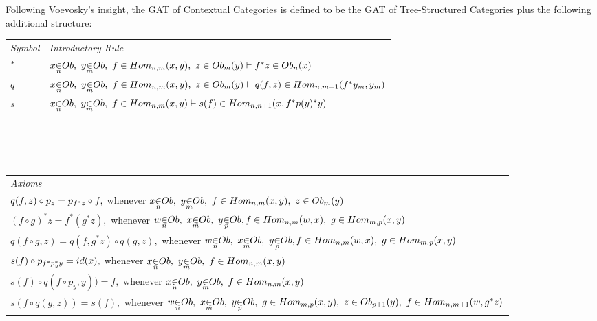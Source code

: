 \documentclass[10pt,a4paper]{scrartcl}
\begin{document}
\noindent Following Voevosky's insight, the GAT of Contextual Categories is defined to be the GAT of Tree-Structured Categories plus
the following additional structure: \\
\vspace{0.1cm} 
\begin{tabular}{>{\itshape}l l}
Symbol & \itshape{Introductory Rule} \\[0.1cm]
$^* $&$ \ofObi{x}{n} ,\  \ofObi{y}{m} ,\  \ofHomij{f}{n}{m}{x}{y} ,\  \ofT{z}{\Obi{m}(y)}
\tstyle \ofT {f \sub z}{\Obi{n}(x) } $\\[0.25cm]
$ q  $&$ \ofObi{x}{n} ,\  \ofObi{y}{m} ,\  \ofHomij{f}{n}{m}{x}{y} ,\  \ofT{z}{\Obi{m}(y)}
\tstyle
                     \ofT{q(f,z)}{  \Homij{n}{m+1}(f\sub y_m  , y_m ) }$  \\ [0.25cm]
$ s  $ & $ \ofObi{x}{n} ,\  \ofObi{y}{m} ,\  \ofHomij{f}{n}{m}{x}{y} \tstyle
                 \ofT{s(f)} {\Homij{n}{n+1}(x,f \sub p (y)  \sub y)} $ \\ [0.25cm]


\end{tabular} \\
\vspace{.1cm}  \\
\vspace{.03cm} \\
\begin{tabular}{l}
\itshape{Axioms} \\
$q(f,z) \circ p_z =p_{f^* z} \circ f,$ 
          whenever $\ofObi{x}{n} ,\  \ofObi{y}{m} ,\  \ofHomij{f}{n}{m}{x}{y} ,\  \ofT{z}{\Obi{m}(y)} $\\  [0.25cm]
					

$(f \circ g)^*z =  f^* (g ^* z), $
          whenever  $ \ofObi{w}{n} ,\ \ofObi{x}{m} ,\ \ofObi{y}{p}, 
					\ofHomij{f}{n}{m}{w}{x} ,\  \ofHomij{g}{m}{p}{x}{y}    $ \\[0.25cm]

$q(f \circ g,z) = q(f,g^*z) \circ q(g,z), $
				   whenever  $ \ofObi{w}{n} ,\ \ofObi{x}{m} ,\ \ofObi{y}{p}, 
					\ofHomij{f}{n}{m}{w}{x} ,\  \ofHomij{g}{m}{p}{x}{y}    $ \\[0.25cm]
					
$s(f) \circ p_{f ^* p_y ^* y} = id(x),$ 
          whenever $\ofObi{x}{n} ,\  \ofObi{y}{m} ,\  \ofHomij{f}{n}{m}{x}{y} $ \\ [0.25cm]
				
$s(f) \circ q( f \circ p_y    ,y))=f, $	
          whenever	$ \ofObi{x}{n} ,\  \ofObi{y}{m} ,\  \ofHomij{f}{n}{m}{x}{y} $ \\ [0.25cm]		
					
$s(f \circ q(g,z))=s(f),$ 
          whenever $\ofObi{w}{n} ,\  \ofObi{x}{m}  ,\   \ofObi{y}{p} ,\    \ofHomij{g}{m}{p}{x}{y} ,\ \ofT{z}{\Obi{p+1}(y)} ,\ \ofHomij{f}{n}{m+1}{w}{g \sub z} $ \\ [0.25cm]				
					
\end{tabular}  \\
\vspace{.1cm}  \\
\vspace{.03cm} \\
\end{document}
